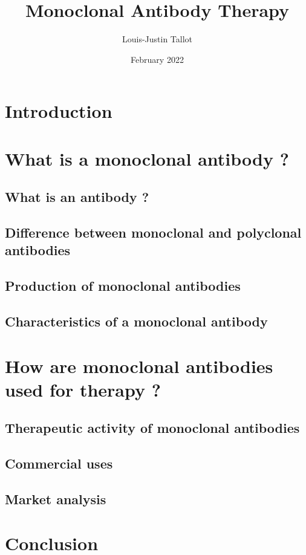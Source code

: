 \documentclass{article}
\title{
  \textbf{Monoclonal Antibody Therapy}
}
\author{Louis-Justin Tallot}
\date{February 2022}
\begin{document}
  \maketitle

  \section*{Introduction}
  

  \section{What is a monoclonal antibody ?}

    \subsection{What is an antibody ?}
    

    \subsection{Difference between monoclonal and polyclonal antibodies}
    

    \subsection{Production of monoclonal antibodies}
    

    \subsection{Characteristics of a monoclonal antibody}
    

  \section{How are monoclonal antibodies used for therapy ?}

    \subsection{Therapeutic activity of monoclonal antibodies}
    

    \subsection{Commercial uses}
    

    \subsection{Market analysis}
    
  
  \section*{Conclusion}


  \printbibliography
\end{document}
